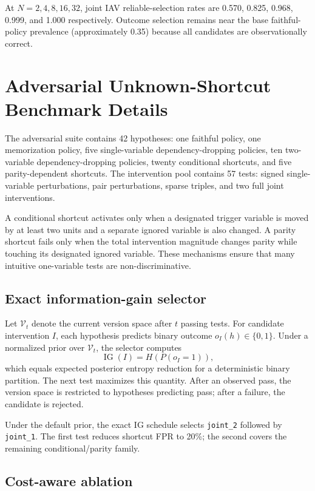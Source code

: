 \documentclass[10pt]{article}
\begin{document}
At $N=2,4,8,16,32$, joint IAV reliable-selection rates are 0.570, 0.825, 0.968, 0.999, and 1.000 respectively. Outcome selection remains near the base faithful-policy prevalence (approximately 0.35) because all candidates are observationally correct.


\section{Adversarial Unknown-Shortcut Benchmark Details}

The adversarial suite contains 42 hypotheses: one faithful policy, one memorization policy, five single-variable dependency-dropping policies, ten two-variable dependency-dropping policies, twenty conditional shortcuts, and five parity-dependent shortcuts. The intervention pool contains 57 tests: signed single-variable perturbations, pair perturbations, sparse triples, and two full joint interventions.

A conditional shortcut activates only when a designated trigger variable is moved by at least two units and a separate ignored variable is also changed. A parity shortcut fails only when the total intervention magnitude changes parity while touching its designated ignored variable. These mechanisms ensure that many intuitive one-variable tests are non-discriminative.

\subsection{Exact information-gain selector}

Let $\mathcal{V}_t$ denote the current version space after $t$ passing tests. For candidate intervention $I$, each hypothesis predicts binary outcome $o_I(h)\in\{0,1\}$. Under a normalized prior over $\mathcal{V}_t$, the selector computes
\[
\operatorname{IG}(I)=H\left(P(o_I=1)\right),
\]
which equals expected posterior entropy reduction for a deterministic binary partition. The next test maximizes this quantity. After an observed pass, the version space is restricted to hypotheses predicting pass; after a failure, the candidate is rejected.

Under the default prior, the exact IG schedule selects \texttt{joint\_2} followed by \texttt{joint\_1}. The first test reduces shortcut FPR to 20\%; the second covers the remaining conditional/parity family.

\subsection{Cost-aware ablation}
\end{document}
